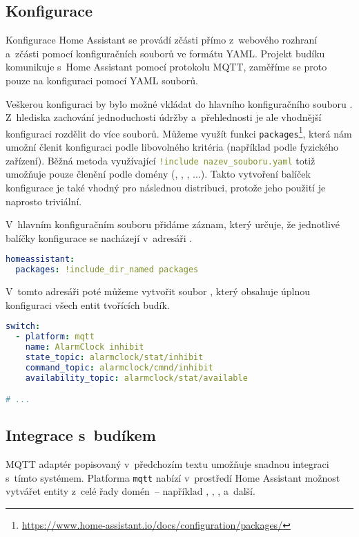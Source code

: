 \subsection{Konfigurace}
Konfigurace Home Assistant se provádí zčásti přímo z~webového rozhraní a~zčásti
pomocí konfiguračních souborů ve formátu YAML. Projekt budíku komunikuje s~Home
Assistant pomocí protokolu MQTT, zaměříme se proto pouze na konfiguraci pomocí
YAML souborů.

Veškerou konfiguraci by bylo možné vkládat do hlavního konfiguračního souboru
.
Z~hlediska zachování jednoduchosti údržby a~přehlednosti je ale vhodnější
konfiguraci rozdělit do více souborů.
Můžeme využít funkci
\texttt{packages}\footnote{\url{https://www.home-assistant.io/docs/configuration/packages/}},
která nám umožní členit konfiguraci podle libovolného kritéria (například podle
fyzického zařízení). Běžná metoda využívající
\lstinline[language=yaml]|!include nazev_souboru.yaml| totiž umožňuje pouze
členění podle domény (, ,
, ...). Takto vytvoření balíček konfigurace je také vhodný pro
následnou distribuci, protože jeho použití je naprosto triviální.

V~hlavním konfiguračním souboru  přidáme záznam,
který určuje, že jednotlivé balíčky konfigurace se nacházejí v~adresáři
.
\begin{lstlisting}[language=yaml]
homeassistant:
  packages: !include_dir_named packages
\end{lstlisting}
V~tomto adresáři poté můžeme vytvořit soubor
, který obsahuje úplnou konfiguraci všech
entit tvořících budík.
\begin{lstlisting}[language=yaml]
switch:
  - platform: mqtt
    name: AlarmClock inhibit
    state_topic: alarmclock/stat/inhibit
    command_topic: alarmclock/cmnd/inhibit
    availability_topic: alarmclock/stat/available

# ...
\end{lstlisting}



\subsection{Integrace s~budíkem}
MQTT adaptér  popisovaný v~předchozím textu
umožňuje snadnou integraci s~tímto systémem. Platforma \texttt{mqtt} nabízí
v~prostředí Home Assistant možnost vytvářet entity z~celé řady domén~--
například , , ,
 a~další.

